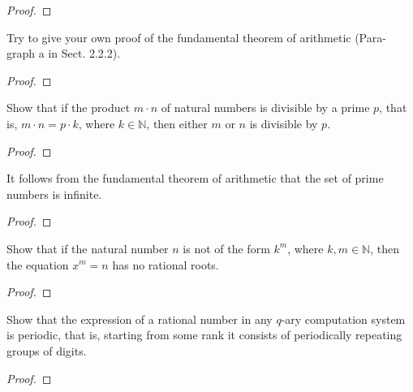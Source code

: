 \begin{proof}
\end{proof}
\newpage

\begin{exercise}
    Try to give your own proof of the fundamental theorem of arithmetic (Para-
    graph a in Sect. 2.2.2).
\end{exercise}

\begin{proof}
\end{proof}
\newpage

\begin{exercise}
    Show that if the product $m\cdot n$ of natural numbers is divisible by a prime $p$, that is, $m\cdot n = p\cdot k$, where $k \in \mathbb{N}$, then either $m$ or $n$ is divisible by $p$.
\end{exercise}

\begin{proof}
\end{proof}
\newpage

\begin{exercise}
    It follows from the fundamental theorem of arithmetic that the set of prime numbers is infinite.
\end{exercise}

\begin{proof}
\end{proof}
\newpage

\begin{exercise}
    Show that if the natural number $n$ is not of the form $k^{m}$, where $k, m \in \mathbb{N}$, then the equation $x^{m} = n$ has no rational roots.
\end{exercise}

\begin{proof}
\end{proof}
\newpage

\begin{exercise}
    Show that the expression of a rational number in any $q$-ary computation system is periodic, that is, starting from some rank it consists of periodically repeating groups of digits.
\end{exercise}

\begin{proof}
\end{proof}
\newpage

\begin{exercise}
\end{exercise}

